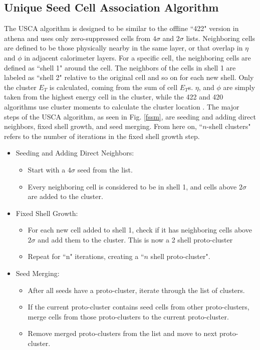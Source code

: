 \FloatBarrier
\subsection{Unique Seed Cell Association Algorithm}\label{usca}

The USCA algorithm is designed to be similar to the offline ``422" version in {\selectfont athena} and uses only zero-suppressed cells from $4\sigma$ and $2\sigma$ lists.
Neighboring cells are defined to be those physically nearby in the same layer, or that overlap in $\eta$ and $\phi$ in adjacent calorimeter layers.
For a specific cell, the neighboring cells are defined as ``shell 1" around the cell.  
The neighbors of the cells in shell 1 are labeled as ``shell 2" relative to the original cell and so on for each new shell.
Only the cluster $E_T$ is calculated, coming from the sum of cell $E_T$s.
$\eta$, and $\phi$ are simply taken from the highest energy cell in the cluster, while the 422 and 420 algorithms use cluster moments to calculate the cluster location \cite{PERF-2014-07}.
The major steps of the USCA algorithm, as seen in Fig. \ref{fssm}, are seeding and adding direct neighbors, fixed shell growth, and seed merging.
From here on, ``$n$-shell clusters" refers to the number of iterations in the fixed shell growth step.


\begin{itemize}
  \item Seeding and Adding Direct Neighbors:
  \begin{itemize}
    \item Start with a $4\sigma$ seed from the list.
    \item Every neighboring cell is considered to be in shell 1, and cells above $2\sigma$ are added to the cluster.
  \end{itemize}
  \item Fixed Shell Growth:
  \begin{itemize}
    \item For each new cell added to shell 1, check if it has neighboring cells above $2\sigma$ and add them to the cluster. This is now a 2 shell proto-cluster
    \item Repeat for ``n" iterations, creating a ``$n$ shell proto-cluster".
  \end{itemize}
  \item Seed Merging:
  \begin{itemize}
    \item After all seeds have a proto-cluster, iterate through the list of clusters.
    \item If the current proto-cluster contains seed cells from other proto-clusters, merge cells from those proto-clusters to the current proto-cluster.
    \item Remove merged proto-clusters from the list and move to next proto-cluster.
  \end{itemize}
\end{itemize}

